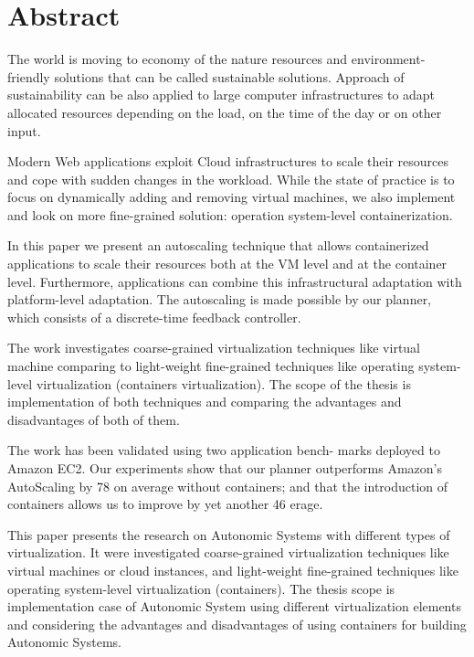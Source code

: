 \newpage
\chapter*{Abstract}

The world is moving to economy of the nature resources and environment-friendly solutions that can be called sustainable solutions. Approach of sustainability can be also applied to large computer infrastructures to adapt allocated resources depending on the load, on the time of the day or on other input.

Modern Web applications exploit Cloud infrastructures to
scale their resources and cope with sudden changes in the
workload. While the state of practice is to focus on dynamically adding and removing virtual machines, we also implement and look on more fine-grained solution: operation system-level containerization.

In this paper we present an autoscaling technique that allows containerized applications to scale their resources both at the VM level and at the container level. Furthermore, applications can combine this infrastructural adaptation with platform-level adaptation. The autoscaling is made possible by our planner, which consists of a discrete-time feedback
controller.

The work investigates coarse-grained virtualization techniques like virtual machine comparing to light-weight fine-grained techniques like operating system-level virtualization (containers virtualization). The scope of the thesis is implementation of both techniques and comparing the advantages and disadvantages of both of them.

\ifx
The work has been validated using two application bench-
marks deployed to Amazon EC2. Our experiments show
that our planner outperforms Amazon’s AutoScaling by 78%
on average without containers; and that the introduction of
containers allows us to improve by yet another 46%
erage.

This paper presents the research on Autonomic Systems with different types of virtualization. It were investigated coarse-grained virtualization techniques like virtual machines or cloud instances, and light-weight fine-grained techniques like operating system-level virtualization (containers). The thesis scope is implementation case of Autonomic System using different virtualization elements and considering the advantages and disadvantages of using containers for building Autonomic Systems.
\fi